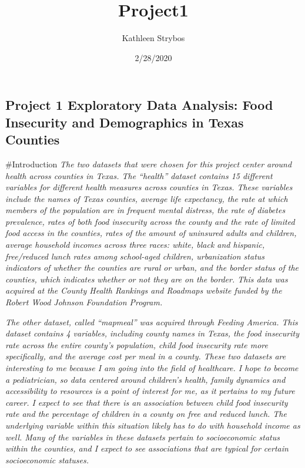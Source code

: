 \documentclass[]{article}
\title{Project1}
\author{Kathleen Strybos}
\date{2/28/2020}
\begin{document}
\maketitle

\hypertarget{project-1-exploratory-data-analysis-food-insecurity-and-demographics-in-texas-counties}{%
\subsection{Project 1 Exploratory Data Analysis: Food Insecurity and
Demographics in Texas
Counties}\label{project-1-exploratory-data-analysis-food-insecurity-and-demographics-in-texas-counties}}

\#Introduction \emph{The two datasets that were chosen for this project
center around health across counties in Texas. The ``health'' dataset
contains 15 different variables for different health measures across
counties in Texas. These variables include the names of Texas counties,
average life expectancy, the rate at which members of the population are
in frequent mental distress, the rate of diabetes prevalence, rates of
both food insecurity across the county and the rate of limited food
access in the counties, rates of the amount of uninsured adults and
children, average household incomes across three races: white, black and
hispanic, free/reduced lunch rates among school-aged children,
urbanization status indicators of whether the counties are rural or
urban, and the border status of the counties, which indicates whether or
not they are on the border. This data was acquired at the County Health
Rankings and Roadmaps website funded by the Robert Wood Johnson
Foundation Program.}

\emph{The other dataset, called ``mapmeal'' was acquired through Feeding
America. This dataset contains 4 variables, including county names in
Texas, the food insecurity rate across the entire county's population,
child food insecurity rate more specifically, and the average cost per
meal in a county. These two datasets are interesting to me because I am
going into the field of healthcare. I hope to become a pediatrician, so
data centered around children's health, family dynamics and
accessibility to resources is a point of interest for me, as it pertains
to my future career. I expect to see that there is an association
between child food insecurity rate and the percentage of children in a
county on free and reduced lunch. The underlying variable within this
situation likely has to do with household income as well. Many of the
variables in these datasets pertain to socioeconomic status within the
counties, and I expect to see associations that are typical for certain
socioeconomic statuses.}
\end{document}
